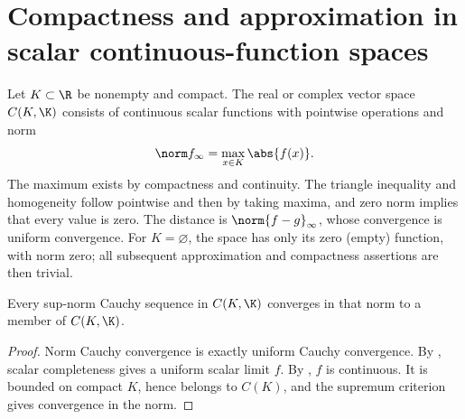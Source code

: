 \chapter{Compactness and approximation in scalar continuous-function spaces}

\begin{definition}
Let $K\subset\R$ be nonempty and compact. The real or complex vector space $C(K,\K)$ consists of continuous scalar functions with pointwise operations and norm
\[\norm f_\infty=\max_{x\in K}\abs{f(x)}.\]
The maximum exists by compactness and continuity. The triangle inequality and homogeneity follow pointwise and then by taking maxima, and zero norm implies that every value is zero. The distance is $\norm{f-g}_\infty$, whose convergence is uniform convergence. For $K=\varnothing$, the space has only its zero (empty) function, with norm zero; all subsequent approximation and compactness assertions are then trivial.
\end{definition}

\begin{theorem}
Every sup-norm Cauchy sequence in $C(K,\K)$ converges in that norm to a member of $C(K,\K)$.
\end{theorem}
\begin{proof}
Norm Cauchy convergence is exactly uniform Cauchy convergence. By , scalar completeness gives a uniform scalar limit $f$. By , $f$ is continuous. It is bounded on compact $K$, hence belongs to $C(K)$, and the supremum criterion gives convergence in the norm.
\end{proof}

